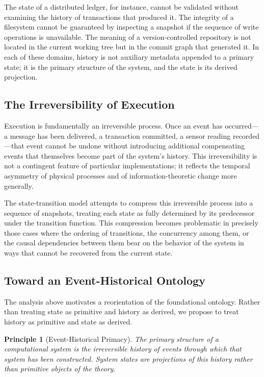 \documentclass[12pt]{article}
\newtheorem{principle}{Principle}
\begin{document}
The state of a distributed ledger, for instance, cannot be validated without examining the
history of transactions that produced it. The integrity of a filesystem cannot be guaranteed by
inspecting a snapshot if the sequence of write operations is unavailable. The meaning of a
version-controlled repository is not located in the current working tree but in the commit graph
that generated it. In each of these domains, history is not auxiliary metadata appended to a
primary state; it is the primary structure of the system, and the state is its derived
projection.

\subsection{The Irreversibility of Execution}

Execution is fundamentally an irreversible process. Once an event has occurred---a message has
been delivered, a transaction committed, a sensor reading recorded---that event cannot be undone
without introducing additional compensating events that themselves become part of the system's
history. This irreversibility is not a contingent feature of particular implementations; it
reflects the temporal asymmetry of physical processes and of information-theoretic change more
generally.

The state-transition model attempts to compress this irreversible process into a sequence of
snapshots, treating each state as fully determined by its predecessor under the transition
function. This compression becomes problematic in precisely those cases where the ordering of
transitions, the concurrency among them, or the causal dependencies between them bear on the
behavior of the system in ways that cannot be recovered from the current state.

\subsection{Toward an Event-Historical Ontology}

The analysis above motivates a reorientation of the foundational ontology. Rather than treating
state as primitive and history as derived, we propose to treat history as primitive and state as
derived.

\begin{principle}[Event-Historical Primacy]
The primary structure of a computational system is the irreversible history of events through
which that system has been constructed. System states are projections of this history rather
than primitive objects of the theory.
\end{principle}
\end{document}
